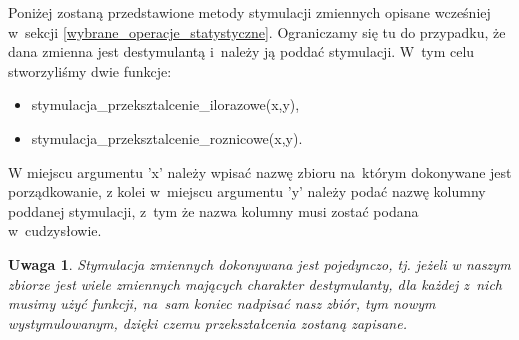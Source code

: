 \documentclass[12pt,a4paper]{report}
\newtheorem{uwaga}{Uwaga}
\begin{document}
{Poniżej zostaną przedstawione metody stymulacji zmiennych opisane wcześniej w~sekcji \ref{wybrane_operacje_statystyczne}. Ograniczamy
się tu do przypadku, że dana zmienna jest destymulantą i~należy
ją poddać stymulacji. W~tym celu stworzyliśmy dwie funkcje:
\begin{itemize}
\item stymulacja\_przeksztalcenie\_ilorazowe(x,y),
\item stymulacja\_przeksztalcenie\_roznicowe(x,y).
\end{itemize}
W miejscu argumentu 'x'
należy wpisać nazwę zbioru na~którym dokonywane jest porządkowanie, z
kolei w~miejscu argumentu 'y' należy podać nazwę kolumny poddanej
stymulacji, z~tym że nazwa kolumny musi zostać podana w~cudzysłowie.

\begin{Shaded}
\begin{Highlighting}[]
\NormalTok{\{}
  \NormalTok{:}
  \NormalTok{\{}
    \NormalTok{x[i,}\NormalTok{(}\NormalTok{(x)==y)]=}\NormalTok{/x[i,}\NormalTok{(}\NormalTok{(x)==y)]}
  \NormalTok{\}}
\NormalTok{\}}
\end{Highlighting}
\end{Shaded}

\begin{Shaded}
\begin{Highlighting}[]
\NormalTok{\{}
  \NormalTok{(x[}\NormalTok{(}\NormalTok{(x)==y)])}
  \NormalTok{:}
  \NormalTok{\{}
    \NormalTok{x[i,}\NormalTok{(}\NormalTok{(x)==y)]=max_wartosc-x[i,}\NormalTok{(}\NormalTok{(x)==y)]}
  \NormalTok{\}}
\NormalTok{\}}
\end{Highlighting}
\end{Shaded}

\begin{uwaga} Stymulacja zmiennych dokonywana jest pojedynczo, tj. jeżeli w
naszym zbiorze jest wiele zmiennych mających charakter destymulanty, dla
każdej z~nich musimy użyć funkcji, na~sam koniec nadpisać nasz zbiór,
tym nowym wystymulowanym, dzięki czemu przekształcenia zostaną zapisane.
\end{uwaga}

}
\end{document}

